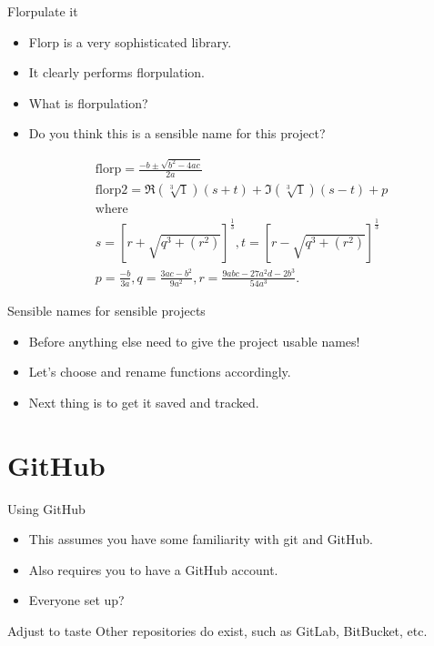 \documentclass[usenames,dvipsnames]{beamer}
\newcommand{\filet}[1]{\textcolor{blue}{\texttt{\detokenize{#1}}}}
\begin{document}
\begin{frame}{Florpulate it}
    \begin{itemize}[<+->]
        \item{}Florp is a very sophisticated library.
        \item{}It clearly performs florpulation.
        \item{}What is florpulation?
        \item{}Do you think this is a sensible name for this project?
    \end{itemize}
    \begin{align*}
        &\text{florp} = \frac{-b\pm\sqrt{b^{2} - 4ac}}{2a} \\
        &\text{florp2} = \Re{}(\sqrt[3]{1})(s + t) + \Im{}(\sqrt[3]{1})(s-t) + p \\
        &\text{where} \\
        &s = \left[r + \sqrt{q^3 + (r^2)}\right]^{\frac{1}{3}}, 
        t = \left[r - \sqrt{q^3 + (r^2)}\right]^{\frac{1}{3}}\\
        &p = \frac{-b}{3a},
        q = \frac{3ac - b^2}{9a^2}, 
        r = \frac{9abc - 27a^2d - 2b^3}{54a^3}.
    \end{align*}
\end{frame}

\begin{frame}{Sensible names for sensible projects}
    \begin{itemize}[<+->]
        \item{}Before anything else need to give the project usable names!
        \item{}Let's choose \filet{polysolve.py} and rename functions accordingly.
        \item{}Next thing is to get it saved and tracked.
    \end{itemize}
\end{frame}

\section{GitHub}

\begin{frame}{Using GitHub}
    \begin{itemize}[<+->]
        \item{}This assumes you have some familiarity with git and GitHub.
        \item{}Also requires you to have a GitHub account.
        \item{}Everyone set up?
    \end{itemize}

    \begin{block}{Adjust to taste}
        Other repositories do exist, such as GitLab, BitBucket, etc. 
    \end{block}
\end{frame}
\end{document}

